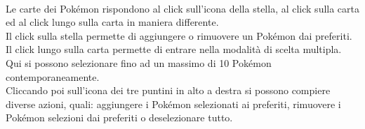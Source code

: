 \documentclass[a4paper,11pt]{article}
\begin{document}
  \paragraph{}
  Le carte dei Pokémon rispondono al click sull’icona della stella, al click sulla carta ed al click lungo sulla carta in maniera differente.\\
Il click sulla stella permette di aggiungere o rimuovere un Pokémon dai preferiti.\\
Il click lungo sulla carta permette di entrare nella modalità di scelta multipla. Qui si possono selezionare fino ad un massimo di 10 Pokémon contemporaneamente.\\
Cliccando poi sull’icona dei tre puntini in alto a destra si possono compiere diverse azioni, quali: aggiungere i Pokémon selezionati ai preferiti, rimuovere i Pokémon selezioni dai preferiti o deselezionare tutto.\\
\end{document}
